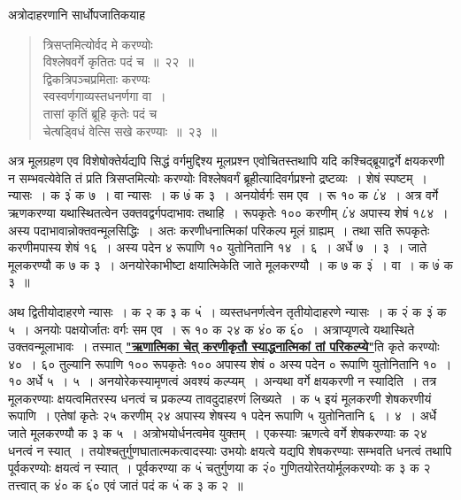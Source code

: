 \documentclass[11pt, openany]{book}
\begin{document}
\vspace{-3mm}
 अत्रोदाहरणानि सार्धोपजातिकयाह\textendash  
\begin{quote}
    \ex
     त्रिसप्तमित्योर्वद मे करण्योः \\

\vspace{-7mm}
\hspace{1cm} विश्लेषवर्गे कृतितः पदं च~॥~२२~॥\\

 \vspace{-4mm}
 द्विकत्रिपञ्चप्रमिताः करण्यः \\

\vspace{-7mm}
\hspace{1cm} स्वस्वर्णगाव्यस्तधनर्णगा वा~। \\

\vspace{-7mm}
 तासां कृतिं ब्रूहि कृतेः पदं च \\

\vspace{-7mm}
\hspace{1cm} चेत्षड्विधं वेत्सि सखे करण्याः~॥~२३~॥
\end{quote}

 अत्र मूलग्रहण एव विशेषोक्तेर्यद्यपि सिद्धं वर्गमुद्दिश्य मूलप्रश्न 
एवोचितस्तथापि यदि कश्चिद्ब्रूयाद्वर्गे क्षयकरणी न सम्भवत्येवेति तं प्रति
त्रिसप्तमित्योः करण्योः विश्लेषवर्गं ब्रूहीत्यादिवर्गप्रश्नो
द्रष्टव्यः~। शेषं स्पष्टम्~। न्यासः~। क ३ं क ७~। वा न्यासः~। क ७ं क ३~। अनयोर्वर्गः सम एव~। रू १० क ८ं४~। अत्र वर्गे ऋणकरण्या यथास्थितत्वेन 
उक्तवद्वर्गपदाभावः तथाहि~। रूपकृतेः १०० करणीम् ८ं४ अपास्य शेषं 
१८४~। अस्य पदाभावान्नोक्तवन्मूलसिद्धिः~। अतः करणीधनात्मिकां परिकल्प 
मूलं ग्राह्यम्~। तथा सति रूपकृतेः करणीमपास्य शेषं १६~। अस्य पदेन 
४ रूपाणि १० युतोनितानि १४~। ६~। अर्धे ७~। ३~। जाते मूलकरण्यौ 
क ७ क ३~। अनयोरेकाभीष्टा क्षयात्मिकेति जाते मूलकरण्यौ~। क ७ 
क ३ं~। वा~। क ७ं क ३~॥
\newpage

 अथ द्वितीयोदाहरणे न्यासः~। क २ क ३ क ५ं~। व्यस्तधनर्णत्वेन तृतीयोदाहरणे न्यासः~। क २ं क ३ं क ५~। अनयोः पक्षयोर्जातः वर्गः सम एव~। रू १० क २४ क ४ं० क ६ं०~। अत्राप्यृणत्वे यथास्थिते उक्तवन्मूलाभावः~। तस्मात् \hyperref[21]{\textbf{"ऋणात्मिका चेत् करणीकृतौ स्याद्धनात्मिकां तां परिकल्प्ये"}}ति कृते करण्योः ४०~। ६० तुल्यानि रूपाणि १०० रूपकृतेः १०० अपास्य शेषं ० अस्य पदेन ० रूपाणि युतोनितानि १०~। १० अर्धे ५~। ५~। अनयोरेकस्यामृणत्वं अवश्यं कल्प्यम्~। अन्यथा वर्गे क्षयकरणी न स्यादिति~। तत्र मूलकरण्याः क्षयत्वमितरस्य धनत्वं च प्रकल्प्य तावदुदाहरणं लिख्यते~। क ५ इयं मूलकरणी शेषकरणीयं रूपाणि~। एतेषां कृतेः २५ करणीम् २४ अपास्य शेषस्य १ पदेन रूपाणि ५ युतोनितानि ६~। ४~। अर्धे जाते मूलकरण्यौ क ३ क ५~। अत्रोभयोर्धनत्वमेव युक्तम्~। एकस्याः ऋणत्वे वर्गे शेषकरण्याः क २४ धनत्वं न स्यात्~। तयोश्चतुर्गुणघातात्मकत्वादस्याः उभयोः क्षयत्वे यद्यपि शेषकरण्याः सम्भवति धनत्वं तथापि पूर्वकरण्योः क्षयत्वं न स्यात्~। पूर्वकरण्या क ५ं चतुर्गुणया क २ं० 
गुणितयोरेतयोर्मूलकरण्योः क ३ क २ तत्त्वात् क ४ं० क ६ं० एवं 
जातं पदं क ५ं क ३ क २~॥ \\
\end{document}
